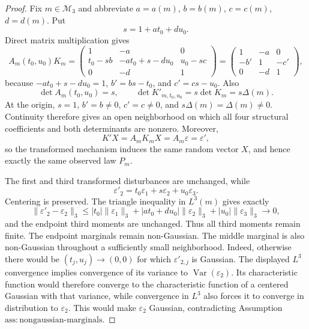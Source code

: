\documentclass{article}
\begin{document}
\begin{proof}
Fix \(m\in\mathcal M_3\) and abbreviate \(a=a(m)\), \(b=b(m)\), \(c=c(m)\), \(d=d(m)\). Put
\[
s=1+at_0+du_0.
\]
Direct matrix multiplication gives
\[
A_m(t_0,u_0)K_m=
\begin{pmatrix}
1&-a&0\\
t_0-sb&-at_0+s-du_0&u_0-sc\\
0&-d&1
\end{pmatrix}
=
\begin{pmatrix}
1&-a&0\\
-b'&1&-c'\\
0&-d&1
\end{pmatrix},
\]
because \(-at_0+s-du_0=1\), \(b'=bs-t_0\), and \(c'=cs-u_0\). Also
\[
\det A_m(t_0,u_0)=s,
\qquad
\det K'_{m,t_0,u_0}=s\det K_m=s\Delta(m).
\]
At the origin, \(s=1\), \(b'=b\neq0\), \(c'=c\neq0\), and \(s\Delta(m)=\Delta(m)\neq0\). Continuity therefore gives an open neighborhood on which all four structural coefficients and both determinants are nonzero. Moreover,
\[
K'X=A_mK_mX=A_m\varepsilon=\varepsilon',
\]
so the transformed mechanism induces the same random vector \(X\), and hence exactly the same observed law \(P_m\).

The first and third transformed disturbances are unchanged, while
\[
\varepsilon'_2=t_0\varepsilon_1+s\varepsilon_2+u_0\varepsilon_3.
\]
Centering is preserved. The triangle inequality in \(L^3(m)\) gives exactly
\[
\|\varepsilon'_2-\varepsilon_2\|_3
\le |t_0|\|\varepsilon_1\|_3
+|at_0+du_0|\|\varepsilon_2\|_3
+|u_0|\|\varepsilon_3\|_3\longrightarrow0,
\]
and the endpoint third moments are unchanged. Thus all third moments remain finite. The endpoint marginals remain non-Gaussian. The middle marginal is also non-Gaussian throughout a sufficiently small neighborhood. Indeed, otherwise there would be \((t_j,u_j)\to(0,0)\) for which \(\varepsilon'_{2,j}\) is Gaussian. The displayed \(L^3\) convergence implies convergence of its variance to \(\operatorname{Var}(\varepsilon_2)\). Its characteristic function would therefore converge to the characteristic function of a centered Gaussian with that variance, while convergence in \(L^3\) also forces it to converge in distribution to \(\varepsilon_2\). This would make \(\varepsilon_2\) Gaussian, contradicting Assumption \(\mathrm{ass:nongaussian\mbox{-}marginals}\).


\end{proof}
\end{document}
